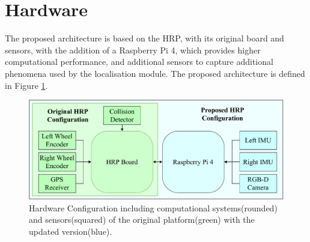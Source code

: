 
\section{Hardware}
\label{sec:system}

\noindent
The proposed architecture is based on the \gls{HRP}, with its original board and sensors, with the addition of a Raspberry Pi 4, which provides higher computational performance, and additional sensors to capture additional phenomena used by the localisation module.
The proposed architecture is defined in Figure \ref{fig:hard-conf}.


\begin{figure}[!ht]
	\begin{center}
		\includegraphics[width=1 \textwidth]{Images/3-0-SetUp/HWSetUp.pdf}
		\caption{Hardware Configuration including computational systems(rounded) and sensors(squared) of the original platform(green) with the updated version(blue). \centering }
		\label{fig:hard-conf}
	\end{center}
\end{figure}


